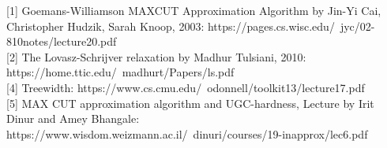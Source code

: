 \documentclass{article}
\begin{document}






[1] Goemans-Williamson MAXCUT Approximation Algorithm by Jin-Yi Cai, Christopher Hudzik, Sarah Knoop, 2003:
https://pages.cs.wisc.edu/~jyc/02-810notes/lecture20.pdf \\

[2] The Lovasz-Schrijver relaxation by Madhur Tulsiani, 2010: 
https://home.ttic.edu/~madhurt/Papers/ls.pdf \\


[4] Treewidth: 
https://www.cs.cmu.edu/~odonnell/toolkit13/lecture17.pdf\\

[5] MAX CUT approximation algorithm and UGC-hardness, Lecture by Irit Dinur and Amey Bhangale:
https://www.wisdom.weizmann.ac.il/~dinuri/courses/19-inapprox/lec6.pdf \\
\end{document}
